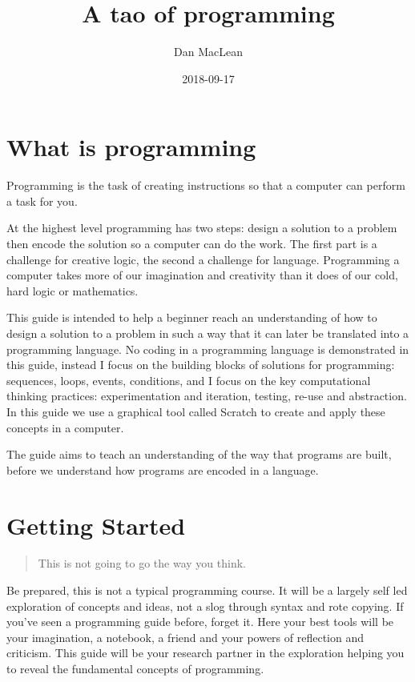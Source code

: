 \documentclass[]{book}
\title{A tao of programming}
\author{Dan MacLean}
\date{2018-09-17}
\begin{document}
\maketitle

{
\setcounter{tocdepth}{1}
\tableofcontents
}
\hypertarget{what-is-programming}{%
\chapter{What is programming}\label{what-is-programming}}

Programming is the task of creating instructions so that a computer can
perform a task for you.

At the highest level programming has two steps: design a solution to a
problem then encode the solution so a computer can do the work. The
first part is a challenge for creative logic, the second a challenge for
language. Programming a computer takes more of our imagination and
creativity than it does of our cold, hard logic or mathematics.

This guide is intended to help a beginner reach an understanding of how
to design a solution to a problem in such a way that it can later be
translated into a programming language. No coding in a programming
language is demonstrated in this guide, instead I focus on the building
blocks of solutions for programming: sequences, loops, events,
conditions, and I focus on the key computational thinking practices:
experimentation and iteration, testing, re-use and abstraction. In this
guide we use a graphical tool called Scratch to create and apply these
concepts in a computer.

The guide aims to teach an understanding of the way that programs are
built, before we understand how programs are encoded in a language.

\hypertarget{getting-started}{%
\chapter{Getting Started}\label{getting-started}}

\begin{quote}
This is not going to go the way you think.
\end{quote}

Be prepared, this is not a typical programming course. It will be a
largely self led exploration of concepts and ideas, not a slog through
syntax and rote copying. If you've seen a programming guide before,
forget it. Here your best tools will be your imagination, a notebook, a
friend and your powers of reflection and criticism. This guide will be
your research partner in the exploration helping you to reveal the
fundamental concepts of programming.
\end{document}

